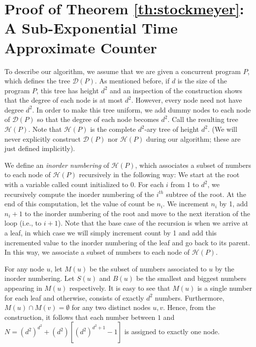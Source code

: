 \section{Proof of Theorem \ref{th:stockmeyer}: A Sub-Exponential Time Approximate Counter}
\label{sec:stockmeyer}


To describe our algorithm, we assume that we are given a concurrent program $P$, 
which defines the tree $\mathcal{D}(P)$. 
As mentioned before, if $d$ is the size of the program $P$, 
this tree has height $d^2$ and an inspection of the construction shows that the degree of each node is at most $d^2$. 
However, every node need not have degree $d^2$. In order to make this tree uniform, we add dummy nodes to each node of $\mathcal{D}(P)$ so that the degree of each node becomes $d^2$. 
Call the resulting tree $\mathcal{H}(P)$. Note that $\mathcal{H}(P)$ 
is the complete $d^2$-ary tree of height $d^2$. 
(We will never explicitly construct $\mathcal{D}(P)$ nor $\mathcal{H}(P)$ during our algorithm; 
these are just defined implicitly). 



We define an \emph{inorder numbering} of $\mathcal{H}(P)$, which associates a subset of numbers to each node of $\mathcal{H}(P)$ recursively in the following way: We start at the root with a variable called count initialized to 0. For each $i$ from 1 to $d^2$, we recursively compute the inorder numbering of the $i^{th}$ subtree of the root. At the end of this computation, let the value of count be $n_i$. We increment $n_i$ by 1,
add $n_i+1$ to the inorder numbering of the root and move to the next iteration of the loop (i.e., to $i+1$). Note that the base case of the recursion is when we arrive at a leaf, in which case we will simply increment count by 1 and add this incremented value to the inorder numbering of the leaf and go back to its parent. In this way, we associate a subset of numbers to each node of $\mathcal{H}(P)$. 

For any node $u$, let $M(u)$ be the subset of numbers associated to $u$ by the inorder numbering. Let $S(u)$ and $B(u)$ be the smallest and biggest numbers appearing in $M(u)$ respectively. It is easy to see that $M(u)$ is a single number for each leaf
and otherwise, consists of exactly $d^2$ numbers. Furthermore, $M(u) \cap M(v) = \emptyset$
for any two distinct nodes $u,v$. 
Hence, from the construction, it follows that each number between $1$ and $N = (d^2)^{d^2} + (d^2)[{(d^2)^{d^2+1}} - 1]$ is assigned to exactly one node.

